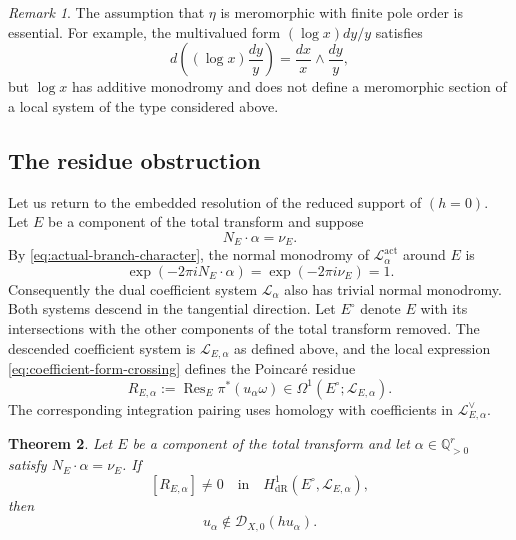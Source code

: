 \documentclass[12pt]{amsart}
\numberwithin{equation}{section}
\theoremstyle{plain}
\newtheorem{theorem}{Theorem}[section]
\theoremstyle{definition}
\theoremstyle{remark}
\newtheorem{remark}[theorem]{Remark}
\theoremstyle{definition}
\DeclareMathOperator{\Res}{Res}
\newcommand{\Q}{\mathbb Q}
\newcommand{\D}{\mathscr D}
\newcommand{\Lcal}{\mathscr L}
\begin{document}
\begin{remark}
The assumption that $\eta$ is meromorphic with finite pole order is essential. For example, the multivalued form $(\log x)dy/y$ satisfies
\begin{equation*}
d\left((\log x)\frac{dy}{y}\right)=\frac{dx}{x}\wedge\frac{dy}{y},
\end{equation*}
but $\log x$ has additive monodromy and does not define a meromorphic section of a local system of the type considered above.
\end{remark}


\subsection{The residue obstruction}

Let us return to the embedded resolution of the reduced support of $(h=0)$. Let $E$ be a component of the total transform and suppose
\begin{equation}\label{eq:E-wall-equation}
N_E\cdot\alpha=\nu_E.
\end{equation}
By \eqref{eq:actual-branch-character}, the normal monodromy of $\Lcal_\alpha^{\mathrm{act}}$ around $E$ is
\begin{equation*}
\exp(-2\pi iN_E\cdot\alpha)=\exp(-2\pi i\nu_E)=1.
\end{equation*}
Consequently the dual coefficient system $\Lcal_\alpha$ also has trivial normal monodromy. Both systems descend in the tangential direction. Let $E^\circ$ denote $E$ with its intersections with the other components of the total transform removed. The descended coefficient system is $\Lcal_{E,\alpha}$ as defined above, and the local expression \eqref{eq:coefficient-form-crossing} defines the Poincar\'e residue
\begin{equation}\label{eq:coefficient-poincare-residue}
R_{E,\alpha}:=\Res_E\pi^*(u_\alpha\omega)
\in\Omega^1(E^\circ;\Lcal_{E,\alpha}).
\end{equation}
The corresponding integration pairing uses homology with coefficients in $\Lcal_{E,\alpha}^\vee$.

\begin{theorem}\label{thm:direct-residue-obstruction}
Let $E$ be a component of the total transform and let $\alpha\in\Q_{>0}^r$ satisfy $N_E\cdot\alpha=\nu_E$. If
\begin{equation}\label{eq:nonzero-residue-class}
[R_{E,\alpha}]\neq0\quad\text{in}\quad H^1_{\mathrm{dR}}(E^\circ,\Lcal_{E,\alpha}),
\end{equation}
then
\begin{equation*}
u_\alpha\notin\D_{X,0}(hu_\alpha).
\end{equation*}
\end{theorem}
\end{document}

